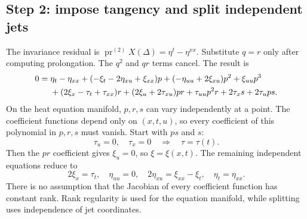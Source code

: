 \documentclass[11pt,a4paper]{article}
\numberwithin{equation}{section}
\theoremstyle{definition}
\theoremstyle{plain}
\theoremstyle{remark}
\newcommand{\pr}{\operatorname{pr}}
\begin{document}
\subsection{Step 2: impose tangency and split independent jets}
The invariance residual is $\pr^{(2)}X(\Delta)=\eta^t-\eta^{xx}$. Substitute $q=r$ only after computing prolongation. The $q^2$ and $qr$ terms cancel. The result is
\begin{align}
0={}&\eta_t-\eta_{xx}
+(-\xi_t-2\eta_{xu}+\xi_{xx})p
+(-\eta_{uu}+2\xi_{xu})p^2+\xi_{uu}p^3\notag\\
&+(2\xi_x-\tau_t+\tau_{xx})r
+(2\xi_u+2\tau_{xu})pr+\tau_{uu}p^2r
+2\tau_xs+2\tau_ups.
\label{eq:heat-residual}
\end{align}
On the heat equation manifold, $p,r,s$ can vary independently at a point. The coefficient functions depend only on $(x,t,u)$, so every coefficient of this polynomial in $p,r,s$ must vanish. Start with $ps$ and $s$:
\[
\tau_u=0,\quad\tau_x=0\quad\Longrightarrow\quad\tau=\tau(t).
\]
Then the $pr$ coefficient gives $\xi_u=0$, so $\xi=\xi(x,t)$. The remaining independent equations reduce to
\begin{equation}\label{eq:heat-determining}
\boxed{2\xi_x=\tau_t,\quad \eta_{uu}=0,\quad
2\eta_{xu}=\xi_{xx}-\xi_t,\quad \eta_t=\eta_{xx}.}
\end{equation}
There is no assumption that the Jacobian of every coefficient function has constant rank. Rank regularity is used for the equation manifold, while splitting uses independence of jet coordinates.
\end{document}
